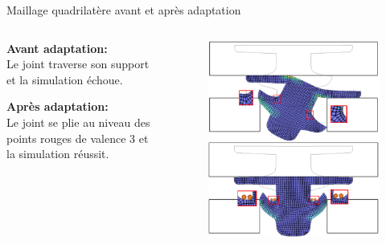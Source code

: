 \begin{frame}{Maillage quadrilatère avant et après adaptation}
    \begin{columns}[T] %
        \begin{column}{.5\textwidth}
        \vspace{1cm}
        \textbf{Avant adaptation:} \\
        Le joint traverse son support et la simulation échoue.
        
        \vspace{1.7cm}
        
        \textbf{Après adaptation:} \\
        Le joint se plie au niveau des points rouges de valence 3 et la simulation réussit.
        \end{column}%
        
        \begin{column}{.5\textwidth}
        \begin{figure}
            \centering
            \includegraphics[width=\linewidth]{img/new_images/joint_with_closeups.PNG}
        \end{figure}
        \end{column}
    \end{columns}
\end{frame}

